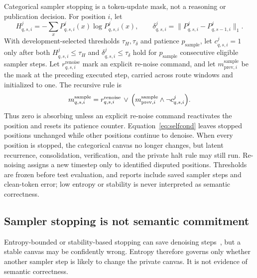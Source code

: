 \documentclass[10pt,a4paper]{article}
\begin{document}
Categorical sampler stopping is a token-update mask, not a reasoning or
publication decision. For position $i$, let
\begin{equation}
H^j_{q,s,i} = - \sum_x P^j_{q,s,i}(x) \log P^j_{q,s,i}(x),
\qquad
\delta^j_{q,s,i} = \bigl\| P^j_{q,s,i} - P^j_{q,s-1,i} \bigr\|_1 .
\end{equation}
With development-selected thresholds $\tau_H, \tau_\delta$ and patience
$p_{\mathrm{sample}}$, let $c^j_{q,s,i} = 1$ only after both
$H^j_{q,s,i} \le \tau_H$ and $\delta^j_{q,s,i} \le \tau_\delta$ hold for
$p_{\mathrm{sample}}$ consecutive eligible sampler steps. Let
$r^{\mathrm{renoise}}_{q,s,i}$ mark an explicit re-noise command, and let
$m^{\mathrm{sample}}_{\mathrm{prev},i}$ be the mask at the preceding executed
step, carried across route windows and initialized to one. The recursive rule
is
\begin{equation}
m^{\mathrm{sample}}_{q,s,i} = r^{\mathrm{renoise}}_{q,s,i} \,\vee\,
\Bigl( m^{\mathrm{sample}}_{\mathrm{prev},i} \wedge \neg c^j_{q,s,i} \Bigr).
\end{equation}
Thus zero is absorbing unless an explicit re-noise command reactivates the
position and resets its patience counter.
Equation~\eqref{eq:selfcond} leaves stopped positions unchanged while other
positions continue to denoise. When every position is stopped, the categorical
canvas no longer changes, but latent recurrence, consolidation, verification,
and the private halt rule may still run. Re-noising assigns a new timestep
only to identified disputed positions. Thresholds are frozen before test
evaluation, and reports include saved sampler steps and clean-token error; low
entropy or stability is never interpreted as semantic correctness.

\subsection{Sampler stopping is not semantic commitment}

Entropy-bounded or stability-based stopping can save denoising
steps~\cite{diffusiongemma,benhamu2025}, but a stable canvas may be
confidently wrong. Entropy therefore governs only whether another sampler step
is likely to change the private canvas. It is not evidence of semantic
correctness.
\end{document}
